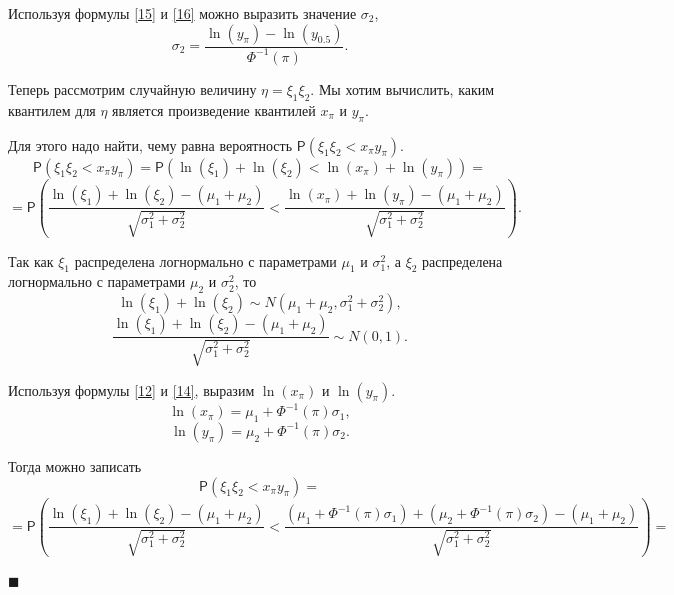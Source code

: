 \documentclass[12pt]{article}
\newenvironment{Proof}{\par\noindent{\bf Доказательство.}}{\hfill$\scriptstyle\blacksquare$}
\begin{document}
\begin{Proof}
		Используя формулы \eqref{15} и \eqref{16} можно выразить значение $\sigma_{2}$,
		\begin{equation}
			\displaystyle{\sigma_{2}=\frac{\ln(y_{\pi})-\ln(y_{0.5})}{\Phi^{-1}(\pi)}.\label{17}}
		\end{equation}
		
		Теперь рассмотрим случайную величину $\eta = \xi_{1}\xi_{2}$. Мы хотим вычислить, каким квантилем для $\eta$ является произведение квантилей $x_{\pi}$ и $y_{\pi}$. 
		
		Для этого надо найти, чему равна вероятность $\mathsf{P}(\xi_{1}\xi_{2}< x_{\pi}y_{\pi})$.
		\begin{equation*}
			\mathsf{P}(\xi_{1}\xi_{2}< x_{\pi}y_{\pi}) = \mathsf{P}(\ln(\xi_{1})+\ln(\xi_{2})<\ln(x_{\pi})+\ln(y_{\pi}))=
		\end{equation*}
		\begin{equation*}
			=\mathsf{P}\left(\displaystyle{\frac{\ln(\xi_{1})+\ln(\xi_{2})-(\mu_{1}+\mu_{2})}{\sqrt{\sigma_{1}^{2}+\sigma_{2}^{2}}}}<\displaystyle{\frac{\ln(x_{\pi})+\ln(y_{\pi})-(\mu_{1}+\mu_{2})}{\sqrt{\sigma_{1}^{2}+\sigma_{2}^{2}}}}\right).
		\end{equation*}
		
		Так как $\xi_{1}$ распределена логнормально с параметрами $\mu_{1}$ и $\sigma_{1}^{2}$, а $\xi_{2}$ распределена логнормально с параметрами $\mu_{2}$ и $\sigma_{2}^{2}$, то
		\begin{equation*} 
			\ln(\xi_{1})+\ln(\xi_{2})\sim N(\mu_{1}+\mu_{2}, \sigma_{1}^{2}+\sigma_{2}^{2}),
		\end{equation*}
		\begin{equation*}
			\frac{\ln(\xi_{1})+\ln(\xi_{2})-(\mu_{1}+\mu_{2})}{\sqrt{\sigma_{1}^{2}+\sigma_{2}^{2}}} \sim N(0,1).
		\end{equation*}
		
		Используя формулы \eqref{12} и \eqref{14}, выразим $\ln(x_{\pi})$ и $\ln(y_{\pi})$.
		\begin{equation*}
			\ln(x_{\pi})=\mu_{1}+\Phi^{-1}(\pi)\sigma_{1},
		\end{equation*}
		\begin{equation*}
			\ln(y_{\pi})=\mu_{2}+\Phi^{-1}(\pi)\sigma_{2}.
		\end{equation*}
		
		Тогда можно записать
		\begin{equation*}
			\mathsf{P}(\xi_{1}\xi_{2}< x_{\pi}y_{\pi}) =
		\end{equation*}
		\begin{equation*}
			=\mathsf{P}\left(\displaystyle{\frac{\ln(\xi_{1})+\ln(\xi_{2})-(\mu_{1}+\mu_{2})}{\sqrt{\sigma_{1}^{2}+\sigma_{2}^{2}}}}<\displaystyle{\frac{(\mu_{1}+\Phi^{-1}(\pi)\sigma_{1})+(\mu_{2}+\Phi^{-1}(\pi)\sigma_{2})-(\mu_{1}+\mu_{2})}{\sqrt{\sigma_{1}^{2}+\sigma_{2}^{2}}}}\right)=
		\end{equation*}
		

\end{Proof}
\end{document}
